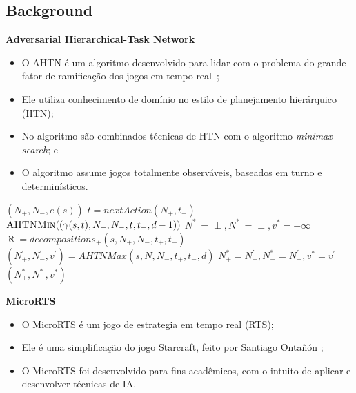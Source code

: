 \documentclass[a0,portrait]{a0poster}
\begin{document}
\begin{multicols}{2}
\section*{\huge Background}
\color{Black}

\textbf{Adversarial Hierarchical-Task Network}

\begin{itemize}
	[leftmargin=2em]\itemadjust
	\item O AHTN \'e um algoritmo desenvolvido para lidar com o problema do grande fator de ramifica\c{c}\~ao dos jogos em tempo real~\cite{ontanon2015adversarial};
	\item Ele utiliza conhecimento de dom\'inio no estilo de planejamento hier\'arquico (HTN);
	\item No algoritmo são combinados t\'ecnicas de HTN com o algoritmo \textit{minimax search}; e
	\item O algoritmo assume jogos totalmente observáveis, baseados em turno e determinísticos. 
\end{itemize}

\vspace{10mm}

\begin{algorithmic}[1]		
	\label{alg:lin:firstLine}
	\State	\Return $(N_{+}, N_{-}, e(s))$
	\EndIf
	 \label{alg:ahtn:nexaction}
	\State $t = nextAction(N_{+}, t_{+})$ 
	\State \Return $\Call{AHTNMin}{(\gamma(s,t), N_{+}, N_{-}, t, t_{-}, d-1)}$ \label{alg:ahtn:troca}
	\EndIf
	\State $N_{+}^{*} = \perp, N_{-}^{*} = \perp, v^{*} = -\infty$
	\State $\aleph = decompositions_{+}(s, N_{+}, N_{-}, t_{+}, t_{-})$ \label{alg:decompositions}
	 \label{alg:ahtn:for}
	\State $(N^{'}_{+}, N^{'}_{-}, v^{'}) = AHTNMax(s, N, N_{-}, t_{+}, t_{-}, d)$
	\State $N_{+}^{*} = N^{'}_{+}, N_{-}^{*} = N^{'}_{-}, v^{*} = v^{'} $
	\EndIf
	\EndFor		
	\State \Return $(N_{+}^{*}, N_{-}^{*}, v^{*} )$
	\EndFunction
\end{algorithmic}


\vspace{10mm}
\textbf{MicroRTS}


\begin{itemize}
	[leftmargin=2em]\itemadjust
	\item O MicroRTS é um jogo de estrategia em tempo real (RTS);
	\item Ele é uma simplificação do jogo Starcraft, feito por Santiago Ontañón \cite{ontanon2013combinatorial};
	\item O MicroRTS foi desenvolvido para fins acadêmicos, com o intuito de aplicar e desenvolver técnicas de IA.
\end{itemize}


\end{multicols}
\end{document}
